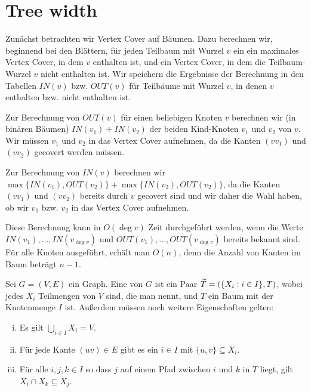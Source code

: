 \chapter{Tree width}

  
  Zunächst betrachten wir Vertex Cover auf Bäumen. Dazu berechnen wir, beginnend bei den Blättern, für jeden Teilbaum mit Wurzel \(v\) ein ein maximales Vertex Cover, in dem \(v\) enthalten ist, und ein Vertex Cover, in dem die Teilbaum-Wurzel \(v\) nicht enthalten ist. Wir speichern die Ergebnisse der Berechnung in den Tabellen \(IN(v)\) bzw. \(OUT(v)\) für Teilbäume mit Wurzel \(v\), in denen \(v\) enthalten bzw. nicht enthalten ist.

  Zur Berechnung von \(OUT(v)\) für einen beliebigen Knoten \(v\) berechnen wir (in binären Bäumen) \(IN(v_1) + IN(v_2)\) der beiden Kind-Knoten \(v_1\) und \(v_2\) von \(v\). Wir müssen \(v_1\) und \(v_2\) in das Vertex Cover aufnehmen, da die Kanten \((vv_1)\) und \((vv_2)\) gecovert werden müssen.

  Zur Berechnung von \(IN(v)\) berechnen wir \(\max \{ IN(v_1), OUT(v_2) \} + \max \{ IN(v_2), OUT(v_2) \}\), da die Kanten \((vv_1)\) und \((vv_2)\) bereits durch \(v\) gecovert sind und wir daher die Wahl haben, ob wir \(v_1\) bzw. \(v_2\) in das Vertex Cover aufnehmen.

  Diese Berechnung kann in \(O(\deg v)\) Zeit durchgeführt werden, wenn die Werte \(IN(v_1), ..., IN(v_{\deg v})\) und \(OUT(v_1), ..., OUT(v_{\deg v})\) bereits bekannt sind. Für alle Knoten ausgeführt, erhält man \(O(n)\), denn die Anzahl von Kanten im Baum beträgt \(n-1\).

  Sei \(G = (V,E)\) ein Graph. Eine  von \(G\) ist ein Paar \(\widetilde{T} = ( \{ X_i : i \in I \}, T )\), wobei jedes \(X_i\) Teilmengen von \(V\) sind, die man  nennt, und \(T\) ein Baum mit der Knotenmenge \(I\) ist. Außerdem müssen noch weitere Eigenschaften gelten:
  \begin{enumerate}[(i)]
   \item Es gilt \(\bigcup_{i \in I} X_i = V\).
   \item Für jede Kante \((uv) \in E\) gibt es ein \(i \in I\) mit \(\{u,v\} \subseteq X_i\).
   \item Für alle \(i,j,k \in I\) so dass \(j\) auf einem Pfad zwischen \(i\) und \(k\) in \(T\) liegt, gilt \(X_i \cap X_k \subseteq X_j\).
  \end{enumerate}

